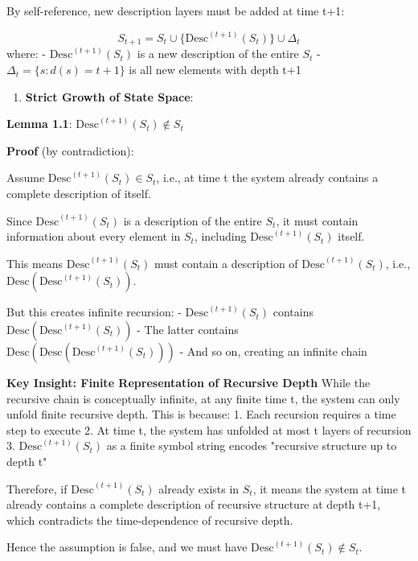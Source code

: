   By self-reference, new description layers must be added at time t+1:
  
\begin{equation}
S_{t+1} = S_t \cup \{\text{Desc}^{(t+1)}(S_t)\} \cup \Delta_t
\end{equation}
  where:
  - $\text{Desc}^{(t+1)}(S_t)$ is a new description of the entire $S_t$
  - $\Delta_t = \{s: d(s) = t+1\}$ is all new elements with depth t+1
  
\begin{enumerate}
\item \textbf{Strict Growth of State Space}:
\end{enumerate}
  \textbf{Lemma 1.1}: $\text{Desc}^{(t+1)}(S_t) \notin S_t$
\label{lem:1.1}
  
  \textbf{Proof} (by contradiction):
  
  Assume $\text{Desc}^{(t+1)}(S_t) \in S_t$, i.e., at time t the system already contains a complete description of itself.
  
  Since $\text{Desc}^{(t+1)}(S_t)$ is a description of the entire $S_t$, it must contain information about every element in $S_t$, including $\text{Desc}^{(t+1)}(S_t)$ itself.
  
  This means $\text{Desc}^{(t+1)}(S_t)$ must contain a description of $\text{Desc}^{(t+1)}(S_t)$, i.e., $\text{Desc}(\text{Desc}^{(t+1)}(S_t))$.
  
  But this creates infinite recursion:
  - $\text{Desc}^{(t+1)}(S_t)$ contains $\text{Desc}(\text{Desc}^{(t+1)}(S_t))$
  - The latter contains $\text{Desc}(\text{Desc}(\text{Desc}^{(t+1)}(S_t)))$
  - And so on, creating an infinite chain
  
  \textbf{Key Insight: Finite Representation of Recursive Depth}
  While the recursive chain is conceptually infinite, at any finite time t, the system can only unfold finite recursive depth.
  This is because:
  1. Each recursion requires a time step to execute
  2. At time t, the system has unfolded at most t layers of recursion
  3. $\text{Desc}^{(t+1)}(S_t)$ as a finite symbol string encodes "recursive structure up to depth t"
  
  Therefore, if $\text{Desc}^{(t+1)}(S_t)$ already exists in $S_t$, it means the system at time t already contains
  a complete description of recursive structure at depth t+1, which contradicts the time-dependence of recursive depth.
  
  Hence the assumption is false, and we must have $\text{Desc}^{(t+1)}(S_t) \notin S_t$.
  

